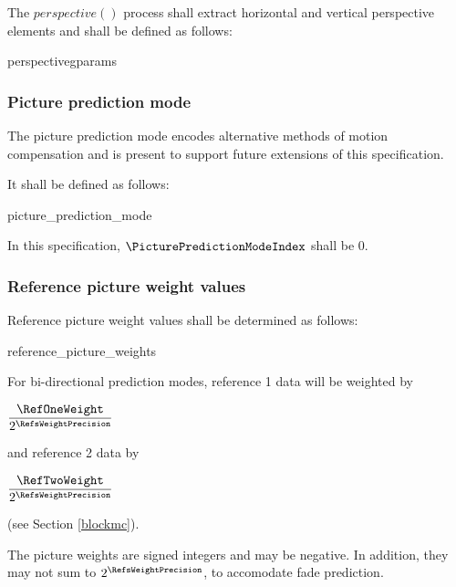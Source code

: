 The $perspective()$ process shall extract horizontal and vertical perspective
elements and shall be defined as follows:

\begin{pseudo}{perspective}{gparams}
\bsELSE
\bsEND
\end{pseudo}

\subsubsection{Picture prediction mode}
\label{picpredmode}

The picture prediction mode encodes alternative methods of motion compensation
and is present to support future extensions of this specification.

It shall be defined as follows:

\begin{pseudo}{picture\_prediction\_mode}{}
\end{pseudo}

In this specification, $\PicturePredictionModeIndex$ shall be 0.

\subsubsection{Reference picture weight values}
\label{refpicweights}

Reference picture weight values shall be determined as follows:

\begin{pseudo}{reference\_picture\_weights}{}
    \bsEND
\bsEND
\end{pseudo}

\begin{informative}
For bi-directional prediction modes, reference 1 data will be weighted by 

$\dfrac{\RefOneWeight}{2^\RefsWeightPrecision}$

and reference 2 data by

$\dfrac{\RefTwoWeight}{2^\RefsWeightPrecision}$ 

(see Section \ref{blockmc}).

The picture weights are signed integers and may be negative. In
addition, they may not sum to $2^\RefsWeightPrecision$, to accomodate fade
prediction.
\end{informative}

